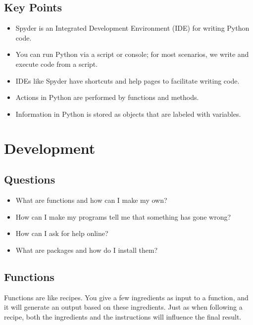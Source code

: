 \documentclass[]{Nemilov}
\providecommand{\tightlist}{%
  \setlength{\itemsep}{0pt}\setlength{\parskip}{0pt}}
\begin{document}
\hypertarget{py-getting-started-keypoints}{%
\section{Key Points}\label{py-getting-started-keypoints}}

\begin{itemize}
\tightlist
\item
  Spyder is an Integrated Development Environment (IDE) for writing Python code.
\item
  You can run Python via a script or console; for most scenarios, we write and execute code from a script.
\item
  IDEs like Spyder have shortcuts and help pages to facilitate writing code.
\item
  Actions in Python are performed by functions and methods.
\item
  Information in Python is stored as objects that are labeled with variables.
\end{itemize}

\hypertarget{py-dev-development}{%
\chapter{Development}\label{py-dev-development}}

\hypertarget{py-dev-questions}{%
\section{Questions}\label{py-dev-questions}}

\begin{itemize}
\tightlist
\item
  What are functions and how can I make my own?
\item
  How can I make my programs tell me that something has gone wrong?
\item
  How can I ask for help online?
\item
  What are packages and how do I install them?
\end{itemize}

\hypertarget{py-dev-functions}{%
\section{Functions}\label{py-dev-functions}}

Functions are like recipes. You give a few ingredients as input to a function,
and it will generate an output based on these ingredients. Just as when
following a recipe, both the ingredients and the instructions will influence
the final result.
\end{document}
